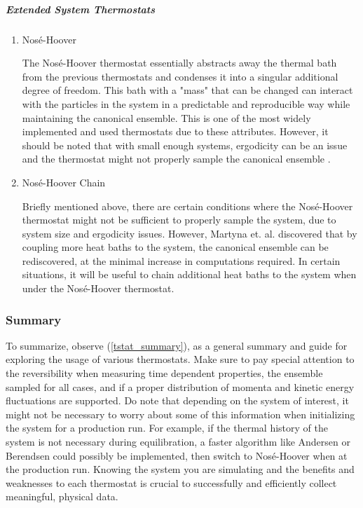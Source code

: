 \documentclass[9pt,bestpractices]{livecoms}
\begin{document}
\subparagraph{Extended System Thermostats}
\begin{enumerate}[listparindent=\parindent]

\item Nosé-Hoover

    The Nosé-Hoover thermostat\cite{thermostatAlgorithms2005} essentially
    abstracts away the thermal bath from the previous thermostats and
    condenses it into a singular additional degree of freedom. This bath
    with a "mass" that can be changed can interact with the particles in the
    system in a predictable and reproducible way while maintaining the
    canonical ensemble. This is one of the most widely implemented and used
    thermostats due to these attributes. However, it should be noted that
    with small enough systems, ergodicity can be an issue and the thermostat
    might not properly sample the canonical ensemble
    \cite{martyna1992nose,thermostatAlgorithms2005}.
    
    
\item Nosé-Hoover Chain

    Briefly mentioned above, there are certain conditions where the Nosé-Hoover
    thermostat might not be sufficient to properly sample the system, due to
    system size and ergodicity issues\cite{martyna1992nose,
    thermostatAlgorithms2005}. However, Martyna et. al.
    \cite{martyna1992nose} discovered that by coupling more heat baths to
    the system, the canonical ensemble can be rediscovered, at the minimal
    increase in computations required. In certain situations, it will be
    useful to chain additional heat baths to the system when under the
    Nosé-Hoover thermostat.

\end{enumerate}


\subsubsection{Summary}
To summarize, observe (\ref{tstat_summary}), as a general summary and guide for
exploring the usage of various thermostats. Make sure to pay special attention
to the reversibility when measuring time dependent properties, the ensemble
sampled for all cases, and if a proper distribution of momenta and kinetic
energy fluctuations are supported.  Do note that depending on the system of
interest, it might not be necessary to worry about some of this information when
initializing the system for a production run. For example, if the thermal
history of the system is not necessary during equilibration, a faster algorithm
like Andersen or Berendsen could possibly be implemented, then switch to
Nosé-Hoover when at the production run. Knowing the system you are simulating
and the benefits and weaknesses to each thermostat is crucial to successfully
and efficiently collect meaningful, physical data.
\end{document}

